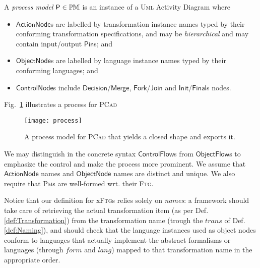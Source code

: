 
\begin{Definition}
A \emph{process model} $\mathsf{P}\in\mathbb{P}\mskip-1mu\mathbb{M}$ is an instance of a \textsc{Uml}
Activity Diagram where
\begin{itemize}
   \item $\mathsf{ActionNode}$s are labelled by transformation instance names 
typed by their conforming transformation specifications, and may be 
\emph{hierarchical} and may contain input/output $\mathsf{Pin}$s; and 
   \item $\mathsf{ObjectNode}$s are labelled by language instance names typed 
by their conforming languages; and 
   \item $\mathsf{ControlNode}$s include 
$\mathsf{Decision}$/$\mathsf{Merge}$, $\mathsf{Fork}$/$\mathsf{Join}$ and 
$\mathsf{Init}$/$\mathsf{Final}$s nodes.   
\end{itemize}
\end{Definition}

Fig.~\ref{fig:Process} illustrates a process for \textsc{PCad} 
\begin{figure}[t]
   \centering
   \texttt{[image: process]}
   \vspace{-1em}
   \caption{A process model for \textsc{PCad} that yields a closed shape and exports it.}%
   \label{fig:Process}%
\end{figure}

We may distinguish in the concrete syntax $\mathsf{ControlFlow}$s from 
$\mathsf{ObjectFlow}$s to emphasize the control and make the process more 
prominent. 
We assume that $\mathsf{ActionNode}$ names and $\mathsf{ObjectNode}$ names 
are distinct and unique. We also require that \textsc{Pm}s are well-formed 
wrt. their \textsc{Ftg}.

Notice that our definition for x\textsc{Ftg}s relies solely on \emph{names}: a 
framework should take care of retrieving the actual transformation item (as per 
Def. \ref{def:Transformation}) from the transformation name (trough 
the $trans$ of Def. \ref{def:Naming}), and should check that the language 
instances used as object nodes conform to languages that actually implement the 
abstract formalisms or languages (through $form$ and $lang$) mapped to that 
transformation name in the appropriate 
order.

